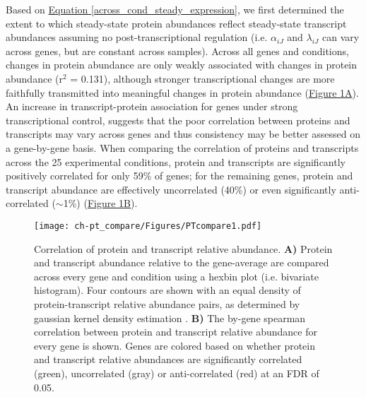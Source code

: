 Based on \hyperref[across_cond_steady_expression]{Equation \ref{across_cond_steady_expression}}, we first determined the extent to which steady-state protein abundances reflect steady-state transcript abundances assuming no post-transcriptional regulation (i.e. $\alpha_{iJ}$ and $\lambda_{iJ}$ can vary across genes, but are constant across samples).  Across all genes and conditions, changes in protein abundance are only weakly associated with changes in protein abundance (r$^{2}$ = 0.131), although stronger transcriptional changes are more faithfully transmitted into meaningful changes in protein abundance (\hyperref[ptscatter]{Figure \ref{ptscatter}A}).  An increase in transcript-protein association for genes under strong transcriptional control, suggests that the poor correlation between proteins and transcripts may vary across genes and thus consistency may be better assessed on a gene-by-gene basis.  When comparing the correlation of proteins and transcripts across the 25 experimental conditions, protein and transcripts are significantly positively correlated for only 59\% of genes; for the remaining genes, protein and transcript abundance are effectively uncorrelated (40\%) or even significantly anti-correlated ($\sim$1\%)  (\hyperref[ptscatter]{Figure \ref{ptscatter}B}).

\begin{figure}[h!]
\begin{center}
\texttt{[image: ch-pt\_compare/Figures/PTcompare1.pdf]}
\caption[Correlation of protein and transcript relative abundance]{Correlation of protein and transcript relative abundance.  \textbf{A)} Protein and transcript abundance relative to the gene-average are compared across every gene and condition using a hexbin plot (i.e. bivariate histogram).  Four contours are shown with an equal density of protein-transcript relative abundance pairs, as determined by gaussian kernel density estimation \cite{Anonymous:nXZxIOcv}.  \textbf{B)} The by-gene spearman correlation between protein and transcript relative abundance for every gene is shown.  Genes are colored based on whether protein and transcript relative abundances are significantly correlated (green), uncorrelated (gray) or anti-correlated (red) at an FDR of 0.05.}
\label{ptscatter}
\end{center}
\end{figure}

